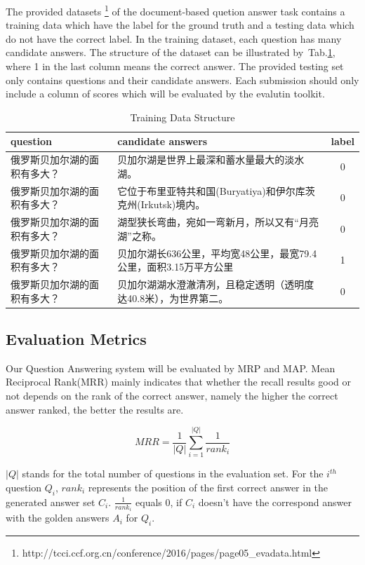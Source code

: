 \documentclass{llncs}
\begin{document}
The provided datasets \footnote{ http://tcci.ccf.org.cn/conference/2016/pages/page05\_evadata.html} of the document-based quetion answer task contains a training data which have the label for the ground truth and a testing data which do not have the correct label. In the training dataset, each question has many candidate answers. The structure of the dataset can be illustrated by~Tab.\ref{tab:table1}, where 1 in the last column means the correct answer. The provided testing set only contains questions and their candidate answers. Each submission should only include a column of scores which will be evaluated by the evalutin toolkit.  


\begin{table}[!hbp]
\caption{Training Data Structure}
\scriptsize
\label{tab:table1}
\begin{tabular}{|l|l|c|}
 \hline
question & candidate answers & label \\ \hline
俄罗斯贝加尔湖的面积有多大？& 贝加尔湖是世界上最深和蓄水量最大的淡水湖。& 0 \\
\hline
俄罗斯贝加尔湖的面积有多大？& 它位于布里亚特共和国(Buryatiya)和伊尔库茨克州(Irkutsk)境内。&0\\
\hline
俄罗斯贝加尔湖的面积有多大？& 湖型狭长弯曲，宛如一弯新月，所以又有“月亮湖”之称。&0\\
\hline
俄罗斯贝加尔湖的面积有多大？& 贝加尔湖长636公里，平均宽48公里，最宽79.4公里，面积3.15万平方公里& 1\\
\hline
俄罗斯贝加尔湖的面积有多大？& 贝加尔湖湖水澄澈清冽，且稳定透明（透明度达40.8米），为世界第二。&0\\
\hline
\end{tabular}

\end{table}

\subsection{Evaluation Metrics}
Our Question Answering system will be evaluated by MRP and MAP. Mean Reciprocal Rank(MRR) mainly indicates that whether the recall results good or not depends on the rank of the correct answer, namely the higher the correct answer ranked, the better the results are.

\begin{equation}
MRR=\frac{1}{|Q|}\sum_{i=1}^{|Q|}\frac{1}{rank_{i}}
\end{equation}

$|Q|$ stands for the total number of questions in the evaluation set. For the \(i^{th}\) question \(Q_{i}\), \(rank_{i}\) represents the position of the first correct answer in the generated answer set \(C_{i}\).  \(\frac{1}{rank_{i}}\) equals 0, if \(C_{i}\) doesn't have the correspond answer with the golden answers \(A_{i}\) for \(Q_{i}\). 
\end{document}
